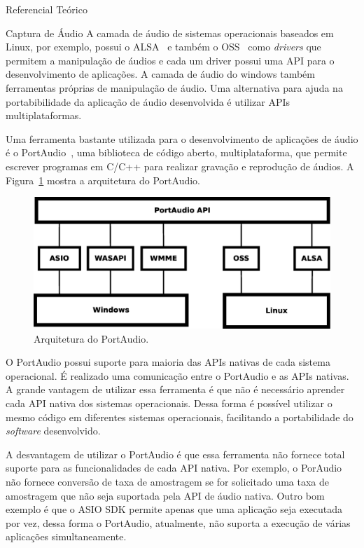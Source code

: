\begin{chapter}{Referencial Teórico}
\begin{section}{Captura de Áudio}
A camada de áudio de sistemas operacionais baseados em Linux, por
exemplo, possui o ALSA~\cite{alsa} e também o OSS~\cite{oss} como
\textit{drivers} que permitem a manipulação de áudios e cada um driver possui
uma API para o desenvolvimento de aplicações. A camada de áudio do windows
também ferramentas próprias de manipulação de áudio. Uma alternativa para ajuda
na portabibilidade da aplicação de áudio desenvolvida é utilizar APIs
multiplataformas.

Uma ferramenta bastante utilizada para o desenvolvimento de aplicações de áudio
é o PortAudio~\cite{portaudio}, uma biblioteca de código aberto,
multiplataforma, que permite escrever programas em C/C++ para realizar gravação
e reprodução de áudios. A Figura~\ref{fig:portaudio} mostra a arquitetura do
PortAudio.

\begin{figure}[!h]
	\centering
	\begin{minipage}[c]{\textwidth}
	\centering
	\includegraphics[width=0.7\linewidth]{fig/portaudio}
	\caption{Arquitetura do PortAudio.}
	\label{fig:portaudio}
	\end{minipage}
\end{figure} 

O PortAudio possui suporte para maioria das APIs nativas de cada sistema
operacional. É realizado uma comunicação entre o PortAudio e as APIs nativas. A
grande vantagem de utilizar essa ferramenta é que não é necessário aprender cada
API nativa dos sistemas operacionais. Dessa forma é possível utilizar o mesmo
código em diferentes sistemas operacionais, facilitando a portabilidade do
\textit{software} desenvolvido.

A desvantagem de utilizar o PortAudio é que essa ferramenta não fornece total
suporte para as funcionalidades de cada API nativa. Por exemplo, o PorAudio não
fornece conversão de taxa de amostragem se for solicitado uma taxa de amostragem
que não seja suportada pela API de áudio nativa. Outro bom exemplo é que o ASIO
SDK permite apenas que uma aplicação seja executada por vez, dessa forma o
PortAudio, atualmente, não suporta a execução de várias aplicações
simultaneamente.


\end{section}
\end{chapter}
